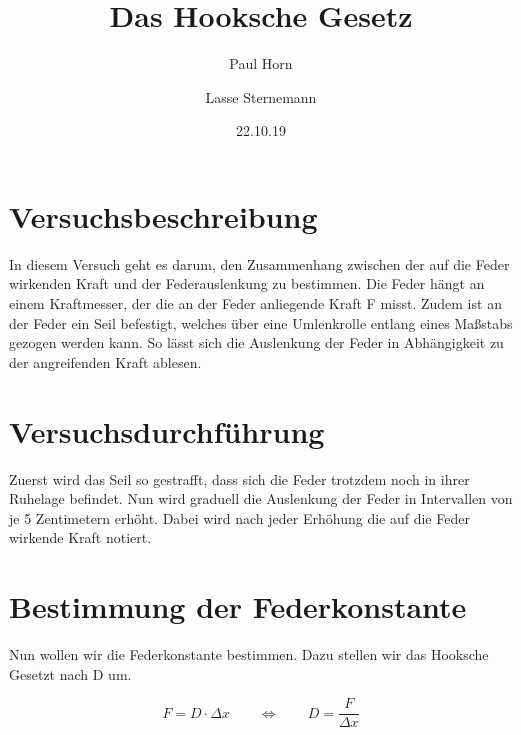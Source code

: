 \documentclass[titlepage = firstcover]{scrartcl}
\title{Das Hooksche Gesetz}
\author{Paul Horn \and Lasse Sternemann}
\date{22.10.19}
\begin{document}
    \maketitle

    \section{Versuchsbeschreibung}
        In diesem Versuch geht es darum, den Zusammenhang zwischen der auf die Feder wirkenden Kraft und der Federauslenkung zu bestimmen.
        Die Feder hängt an einem Kraftmesser, der die an der Feder anliegende Kraft F misst. Zudem ist an der Feder ein Seil befestigt, 
        welches über eine Umlenkrolle entlang eines Maßstabs gezogen werden kann. So lässt sich die Auslenkung der Feder in Abhängigkeit zu
        der angreifenden Kraft ablesen.

    \section{Versuchsdurchführung}
        Zuerst wird das Seil so gestrafft, dass sich die Feder trotzdem noch in ihrer Ruhelage befindet. Nun wird graduell die Auslenkung der 
        Feder in Intervallen von je 5 Zentimetern erhöht. Dabei wird nach jeder Erhöhung die auf die Feder wirkende Kraft notiert.

        
    \section{Bestimmung der Federkonstante}
        Nun wollen wir die Federkonstante bestimmen. Dazu stellen wir das Hooksche Gesetzt nach D um.

    \begin{equation}
        F = D \cdot \Delta x  \qquad \Leftrightarrow  \qquad D = \frac{F}{\Delta x}
    \end{equation} 
\end{document}
